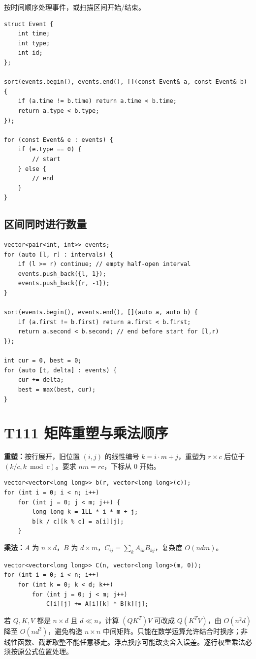 按时间顺序处理事件，或扫描区间开始/结束。

\begin{lstlisting}
struct Event {
    int time;
    int type;
    int id;
};

sort(events.begin(), events.end(), [](const Event& a, const Event& b) {
    if (a.time != b.time) return a.time < b.time;
    return a.type < b.type;
});

for (const Event& e : events) {
    if (e.type == 0) {
        // start
    } else {
        // end
    }
}
\end{lstlisting}

\subsection{区间同时进行数量}

\begin{lstlisting}
vector<pair<int, int>> events;
for (auto [l, r] : intervals) {
    if (l >= r) continue; // empty half-open interval
    events.push_back({l, 1});
    events.push_back({r, -1});
}

sort(events.begin(), events.end(), [](auto a, auto b) {
    if (a.first != b.first) return a.first < b.first;
    return a.second < b.second; // end before start for [l,r)
});

int cur = 0, best = 0;
for (auto [t, delta] : events) {
    cur += delta;
    best = max(best, cur);
}
\end{lstlisting}


\section{T111 矩阵重塑与乘法顺序}\label{sec:09-13}\label{tpl:111}
\textbf{重塑：}按行展开，旧位置 $(i,j)$ 的线性编号 $k=i\cdot m+j$，重塑为 $r\times c$ 后位于 $(k/c,k\bmod c)$。要求 $nm=rc$，下标从 0 开始。
\begin{lstlisting}
vector<vector<long long>> b(r, vector<long long>(c));
for (int i = 0; i < n; i++)
    for (int j = 0; j < m; j++) {
        long long k = 1LL * i * m + j;
        b[k / c][k % c] = a[i][j];
    }
\end{lstlisting}
\textbf{乘法：}$A$ 为 $n\times d$，$B$ 为 $d\times m$，$C_{ij}=\sum_k A_{ik}B_{kj}$，复杂度 $O(ndm)$。
\begin{lstlisting}
vector<vector<long long>> C(n, vector<long long>(m, 0));
for (int i = 0; i < n; i++)
    for (int k = 0; k < d; k++)
        for (int j = 0; j < m; j++)
            C[i][j] += A[i][k] * B[k][j];
\end{lstlisting}
若 $Q,K,V$ 都是 $n\times d$ 且 $d\ll n$，计算 $(QK^T)V$ 可改成 $Q(K^TV)$，由 $O(n^2d)$ 降至 $O(nd^2)$，避免构造 $n\times n$ 中间矩阵。只能在数学运算允许结合时换序；非线性函数、截断取整不能任意移走。浮点换序可能改变舍入误差。逐行权重乘法必须按原公式位置处理。

